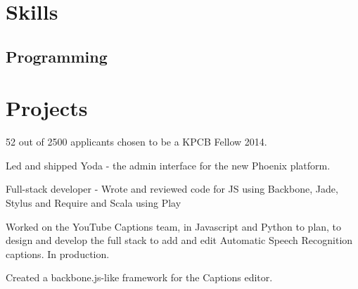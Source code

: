 \documentclass[]{deedy-resume-openfont}
\begin{document}
\begin{minipage}[t]{0.64\textwidth}


\section{Skills}
\subsection{Programming}



\sectionsep


\section{Projects}

\vspace{\topsep} %
\begin{tightemize}
\item 52 out of 2500 applicants chosen to be a KPCB Fellow 2014.
\item Led and shipped Yoda - the admin interface for the new Phoenix platform. 
\item Full-stack developer - Wrote and reviewed code for JS using Backbone, Jade, Stylus and Require and Scala using Play
\end{tightemize}
\sectionsep

\begin{tightemize}
\item Worked on the YouTube Captions team, in Javascript and Python to plan, to design and develop the full stack to add and edit Automatic Speech Recognition captions. In production.
\item Created a backbone.js-like framework for the Captions editor.
\end{tightemize}
\sectionsep


\end{minipage}
\end{document}
